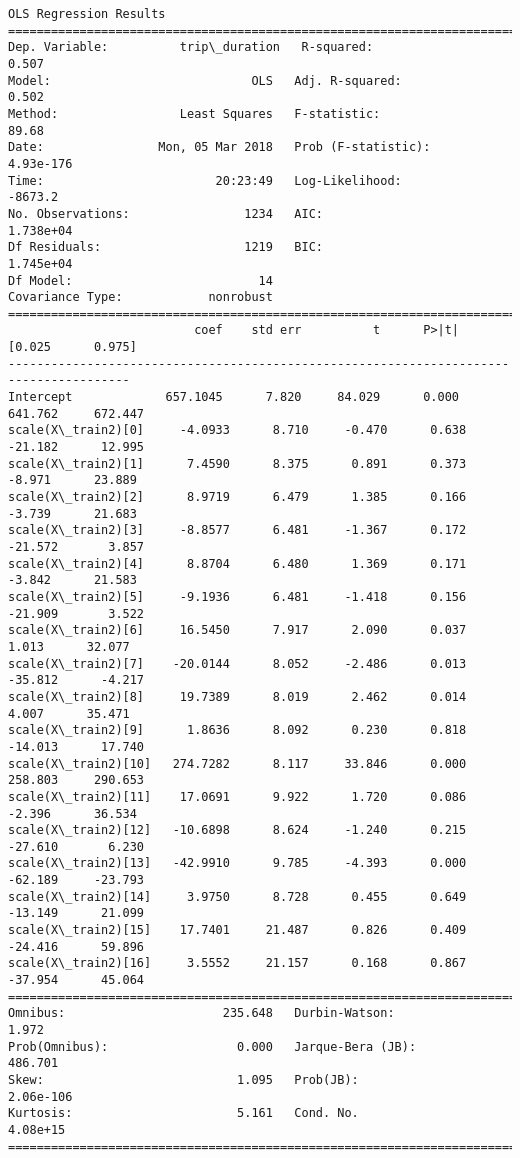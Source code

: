 \documentclass[11pt]{article}
\begin{document}
    \begin{Verbatim}[commandchars=\\\{\}]
                            OLS Regression Results                            
==============================================================================
Dep. Variable:          trip\_duration   R-squared:                       0.507
Model:                            OLS   Adj. R-squared:                  0.502
Method:                 Least Squares   F-statistic:                     89.68
Date:                Mon, 05 Mar 2018   Prob (F-statistic):          4.93e-176
Time:                        20:23:49   Log-Likelihood:                -8673.2
No. Observations:                1234   AIC:                         1.738e+04
Df Residuals:                    1219   BIC:                         1.745e+04
Df Model:                          14                                         
Covariance Type:            nonrobust                                         
=======================================================================================
                          coef    std err          t      P>|t|      [0.025      0.975]
---------------------------------------------------------------------------------------
Intercept             657.1045      7.820     84.029      0.000     641.762     672.447
scale(X\_train2)[0]     -4.0933      8.710     -0.470      0.638     -21.182      12.995
scale(X\_train2)[1]      7.4590      8.375      0.891      0.373      -8.971      23.889
scale(X\_train2)[2]      8.9719      6.479      1.385      0.166      -3.739      21.683
scale(X\_train2)[3]     -8.8577      6.481     -1.367      0.172     -21.572       3.857
scale(X\_train2)[4]      8.8704      6.480      1.369      0.171      -3.842      21.583
scale(X\_train2)[5]     -9.1936      6.481     -1.418      0.156     -21.909       3.522
scale(X\_train2)[6]     16.5450      7.917      2.090      0.037       1.013      32.077
scale(X\_train2)[7]    -20.0144      8.052     -2.486      0.013     -35.812      -4.217
scale(X\_train2)[8]     19.7389      8.019      2.462      0.014       4.007      35.471
scale(X\_train2)[9]      1.8636      8.092      0.230      0.818     -14.013      17.740
scale(X\_train2)[10]   274.7282      8.117     33.846      0.000     258.803     290.653
scale(X\_train2)[11]    17.0691      9.922      1.720      0.086      -2.396      36.534
scale(X\_train2)[12]   -10.6898      8.624     -1.240      0.215     -27.610       6.230
scale(X\_train2)[13]   -42.9910      9.785     -4.393      0.000     -62.189     -23.793
scale(X\_train2)[14]     3.9750      8.728      0.455      0.649     -13.149      21.099
scale(X\_train2)[15]    17.7401     21.487      0.826      0.409     -24.416      59.896
scale(X\_train2)[16]     3.5552     21.157      0.168      0.867     -37.954      45.064
==============================================================================
Omnibus:                      235.648   Durbin-Watson:                   1.972
Prob(Omnibus):                  0.000   Jarque-Bera (JB):              486.701
Skew:                           1.095   Prob(JB):                    2.06e-106
Kurtosis:                       5.161   Cond. No.                     4.08e+15
==============================================================================


\end{Verbatim}
\end{document}
